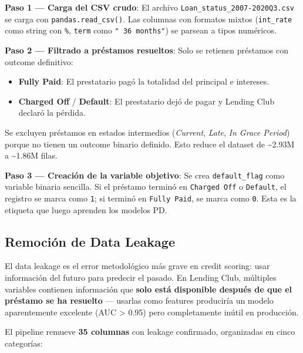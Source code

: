 \documentclass[
  spanish,
  11pt,
  letterpaper,
]{scrbook}
\providecommand{\tightlist}{%
  \setlength{\itemsep}{0pt}\setlength{\parskip}{0pt}}
\theoremstyle{plain}
\theoremstyle{remark}
\begin{document}
\textbf{Paso 1 --- Carga del CSV crudo}: El archivo
\texttt{Loan\_status\_2007-2020Q3.csv} se carga con
\texttt{pandas.read\_csv()}. Las columnas con formatos mixtos
(\texttt{int\_rate} como string con \texttt{\%}, \texttt{term} como
\texttt{"\ 36\ months"}) se parsean a tipos numéricos.

\textbf{Paso 2 --- Filtrado a préstamos resueltos}: Solo se retienen
préstamos con outcome definitivo:

\begin{itemize}
\tightlist
\item
  \textbf{Fully Paid}: El prestatario pagó la totalidad del principal e
  intereses.
\item
  \textbf{Charged Off} / \textbf{Default}: El prestatario dejó de pagar
  y Lending Club declaró la pérdida.
\end{itemize}

Se excluyen préstamos en estados intermedios (\emph{Current},
\emph{Late}, \emph{In Grace Period}) porque no tienen un outcome binario
definido. Esto reduce el dataset de \textasciitilde2.93M a
\textasciitilde1.86M filas.

\textbf{Paso 3 --- Creación de la variable objetivo}: Se crea
\texttt{default\_flag} como variable binaria sencilla. Si el préstamo
terminó en \texttt{Charged\ Off} o \texttt{Default}, el registro se
marca como \texttt{1}; si terminó en \texttt{Fully\ Paid}, se marca como
\texttt{0}. Esta es la etiqueta que luego aprenden los modelos PD.

\subsection{Remoción de Data Leakage}\label{sec-anti-leakage}

El data leakage es el error metodológico más grave en credit scoring:
usar información del futuro para predecir el pasado. En Lending Club,
múltiples variables contienen información que \textbf{solo está
disponible después de que el préstamo se ha resuelto} --- usarlas como
features produciría un modelo aparentemente excelente (AUC
\textgreater{} 0.95) pero completamente inútil en producción.

El pipeline remueve \textbf{35 columnas} con leakage confirmado,
organizadas en cinco categorías:
\end{document}
